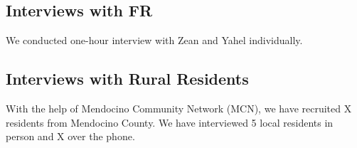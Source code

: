 \subsection{Interviews with FR}
\label{sec:interviews-with-fr}

We conducted one-hour interview with Zean and Yahel individually.

\subsection{Interviews with Rural Residents}
\label{sec:interv-with-rural}

With the help of Mendocino Community Network (MCN), we have recruited X
residents from Mendocino County. We have interviewed 5 local residents in person
and X over the phone.


